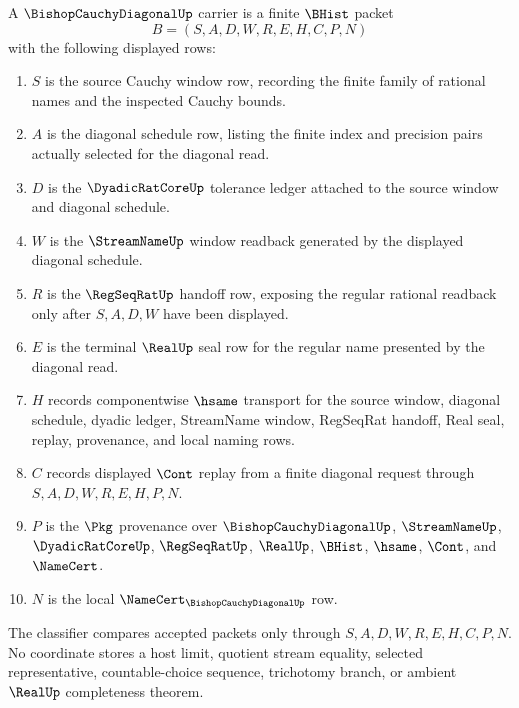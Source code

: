 \begin{definition}
\label{def:bishop-cauchy-diagonal-carrier}
A $\BishopCauchyDiagonalUp$ carrier is a finite $\BHist$ packet
$$
B=(S,A,D,W,R,E,H,C,P,N)
$$
with the following displayed rows:
\begin{enumerate}
\item $S$ is the source Cauchy window row, recording the finite family of rational names and the inspected Cauchy bounds.
\item $A$ is the diagonal schedule row, listing the finite index and precision pairs actually selected for the diagonal read.
\item $D$ is the $\DyadicRatCoreUp$ tolerance ledger attached to the source window and diagonal schedule.
\item $W$ is the $\StreamNameUp$ window readback generated by the displayed diagonal schedule.
\item $R$ is the $\RegSeqRatUp$ handoff row, exposing the regular rational readback only after $S,A,D,W$ have been displayed.
\item $E$ is the terminal $\RealUp$ seal row for the regular name presented by the diagonal read.
\item $H$ records componentwise $\hsame$ transport for the source window, diagonal schedule, dyadic ledger, StreamName window, RegSeqRat handoff, Real seal, replay, provenance, and local naming rows.
\item $C$ records displayed $\Cont$ replay from a finite diagonal request through $S,A,D,W,R,E,H,P,N$.
\item $P$ is the $\Pkg$ provenance over $\BishopCauchyDiagonalUp$, $\StreamNameUp$, $\DyadicRatCoreUp$, $\RegSeqRatUp$, $\RealUp$, $\BHist$, $\hsame$, $\Cont$, and $\NameCert$.
\item $N$ is the local $\NameCert_{\BishopCauchyDiagonalUp}$ row.
\end{enumerate}
The classifier compares accepted packets only through $S,A,D,W,R,E,H,C,P,N$. No coordinate stores a host limit, quotient stream equality, selected representative, countable-choice sequence, trichotomy branch, or ambient $\RealUp$ completeness theorem.
\end{definition}

